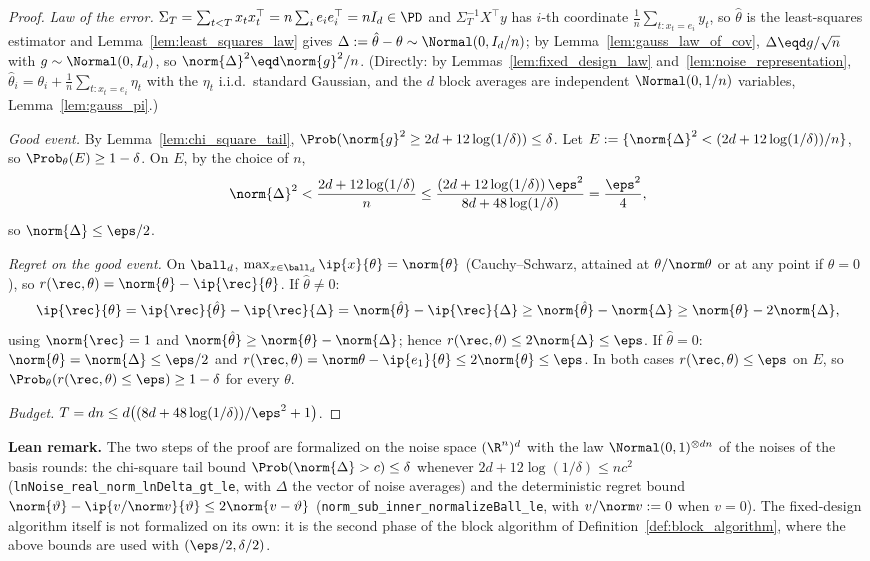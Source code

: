 \begin{proof}
\emph{Law of the error.} $\Sigma_T = \sum_{t<T}x_tx_t^\top = n\sum_ie_ie_i^\top = nI_d \in \PD$ and
$\Sigma_T^{-1}X^\top y$ has $i$-th coordinate $\frac1n\sum_{t : x_t = e_i}y_t$, so $\hat\theta$ is
the least-squares estimator and Lemma~\ref{lem:least_squares_law} gives
$\Delta := \hat\theta - \theta \sim \Normal(0, I_d/n)$; by Lemma~\ref{lem:gauss_law_of_cov},
$\Delta \eqd g/\sqrt n$ with $g \sim \Normal(0,I_d)$, so $\norm{\Delta}^2 \eqd \norm{g}^2/n$.
(Directly: by Lemmas~\ref{lem:fixed_design_law} and~\ref{lem:noise_representation},
$\hat\theta_i = \theta_i + \frac1n\sum_{t : x_t = e_i}\eta_t$ with the $\eta_t$ i.i.d.\ standard
Gaussian, and the $d$ block averages are independent $\Normal(0,1/n)$ variables,
Lemma~\ref{lem:gauss_pi}.)

\emph{Good event.} By Lemma~\ref{lem:chi_square_tail},
$\Prob(\norm{g}^2 \ge 2d + 12\log(1/\delta)) \le \delta$. Let $E := \{\norm{\Delta}^2 <
(2d + 12\log(1/\delta))/n\}$, so $\Prob_\theta(E) \ge 1 - \delta$. On $E$, by the choice of $n$,
\[
  \norm{\Delta}^2 < \frac{2d + 12\log(1/\delta)}{n}
  \le \frac{(2d + 12\log(1/\delta))\,\eps^2}{8d + 48\log(1/\delta)} = \frac{\eps^2}{4},
\]
so $\norm{\Delta} \le \eps/2$.

\emph{Regret on the good event.} On $\ball_d$, $\max_{x\in\ball_d}\ip{x}{\theta} = \norm{\theta}$
(Cauchy--Schwarz, attained at $\theta/\norm\theta$ or at any point if $\theta = 0$), so
$r(\rec,\theta) = \norm{\theta} - \ip{\rec}{\theta}$. If $\hat\theta \ne 0$:
\[
  \ip{\rec}{\theta} = \ip{\rec}{\hat\theta} - \ip{\rec}{\Delta} = \norm{\hat\theta} - \ip{\rec}{\Delta}
  \ge \norm{\hat\theta} - \norm{\Delta} \ge \norm{\theta} - 2\norm{\Delta},
\]
using $\norm{\rec} = 1$ and $\norm{\hat\theta} \ge \norm{\theta} - \norm{\Delta}$; hence
$r(\rec,\theta) \le 2\norm{\Delta} \le \eps$. If $\hat\theta = 0$: $\norm{\theta} = \norm{\Delta}
\le \eps/2$ and $r(\rec,\theta) = \norm\theta - \ip{e_1}{\theta} \le 2\norm{\theta} \le \eps$.
In both cases $r(\rec,\theta) \le \eps$ on $E$, so
$\Prob_\theta(r(\rec,\theta) \le \eps) \ge 1-\delta$ for every $\theta$.

\emph{Budget.} $T = dn \le d\big((8d + 48\log(1/\delta))/\eps^2 + 1\big)$.
\end{proof}

\textbf{Lean remark.} The two steps of the proof are formalized on the noise space
$(\R^n)^d$ with the law $\Normal(0,1)^{\otimes dn}$ of the noises of the basis rounds: the
chi-square tail bound $\Prob(\norm{\Delta} > c) \le \delta$ whenever
$2d + 12\log(1/\delta) \le nc^2$ (\texttt{lnNoise\_real\_norm\_lnDelta\_gt\_le}, with
$\Delta$ the vector of noise averages) and the deterministic regret bound
$\norm{\vartheta} - \ip{v/\norm v}{\vartheta} \le 2\norm{v - \vartheta}$
(\texttt{norm\_sub\_inner\_normalizeBall\_le}, with $v/\norm v := 0$ when $v = 0$). The
fixed-design algorithm itself is not formalized on its own: it is the second phase of the
block algorithm of Definition~\ref{def:block_algorithm}, where the above bounds are used
with $(\eps/2, \delta/2)$.

